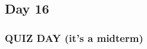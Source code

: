 \documentclass[../notes.tex]{subfiles}
\begin{document}
\subsection{Day 16}
\subsubsection{QUIZ DAY (it's a midterm)}
\end{document}
